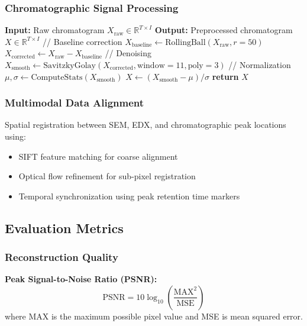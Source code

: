 \documentclass[12pt,a4paper]{article}
\begin{document}
\subsubsection{Chromatographic Signal Processing}

\begin{algorithm}[H]
\caption{Chromatographic Data Preprocessing}
\begin{algorithmic}[1]
\STATE \textbf{Input:} Raw chromatogram $X_{\text{raw}} \in \mathbb{R}^{T \times I}$
\STATE \textbf{Output:} Preprocessed chromatogram $X \in \mathbb{R}^{T \times I}$
\STATE // Baseline correction
\STATE $X_{\text{baseline}} \leftarrow \text{RollingBall}(X_{\text{raw}}, r=50)$
\STATE $X_{\text{corrected}} \leftarrow X_{\text{raw}} - X_{\text{baseline}}$
\STATE // Denoising
\STATE $X_{\text{smooth}} \leftarrow \text{SavitzkyGolay}(X_{\text{corrected}}, \text{window}=11, \text{poly}=3)$
\STATE // Normalization
\STATE $\mu, \sigma \leftarrow \text{ComputeStats}(X_{\text{smooth}})$
\STATE $X \leftarrow (X_{\text{smooth}} - \mu) / \sigma$
\STATE \textbf{return} $X$
\end{algorithmic}
\end{algorithm}

\subsubsection{Multimodal Data Alignment}

Spatial registration between SEM, EDX, and chromatographic peak locations using:
\begin{itemize}
    \item SIFT feature matching for coarse alignment
    \item Optical flow refinement for sub-pixel registration
    \item Temporal synchronization using peak retention time markers
\end{itemize}

\subsection{Evaluation Metrics}

\subsubsection{Reconstruction Quality}

\textbf{Peak Signal-to-Noise Ratio (PSNR):}
\begin{equation}
\text{PSNR} = 10 \log_{10} \left(\frac{\text{MAX}^2}{\text{MSE}}\right)
\end{equation}
where MAX is the maximum possible pixel value and MSE is mean squared error.
\end{document}
